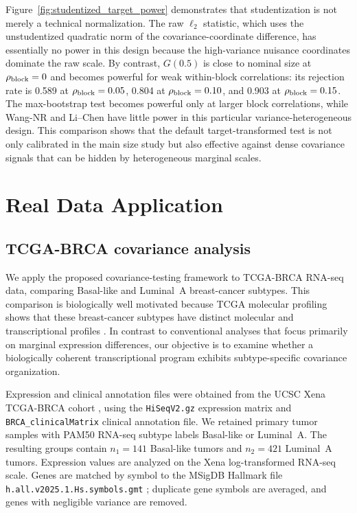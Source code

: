 \documentclass[
  12pt]{article}
\theoremstyle{plain}
\theoremstyle{definition}
\theoremstyle{remark}
\begin{document}
Figure~\ref{fig:studentized_target_power} demonstrates that studentization is
not merely a technical normalization.  The raw \(\ell_2\) statistic, which
uses the unstudentized quadratic norm of the covariance-coordinate difference,
has essentially no power in this design because the high-variance nuisance
coordinates dominate the raw scale.  By contrast, \(G(0.5)\) is close to
nominal size at \(\rho_{\rm block}=0\) and becomes powerful for weak
within-block correlations: its rejection rate is 0.589 at
\(\rho_{\rm block}=0.05\), 0.804 at \(\rho_{\rm block}=0.10\), and 0.903 at
\(\rho_{\rm block}=0.15\).  The max-bootstrap test becomes powerful only at
larger block correlations, while Wang-NR and Li--Chen have little power in this
particular variance-heterogeneous design.  This comparison shows that the
default target-transformed test is not only calibrated in the main size study
but also effective against dense covariance signals that can be hidden by
heterogeneous marginal scales.

\section{Real Data Application}\label{sec:realdata}

\subsection{TCGA-BRCA covariance analysis}

We apply the proposed covariance-testing framework to TCGA-BRCA RNA-seq data, comparing Basal-like and Luminal~A breast-cancer subtypes.  This comparison is biologically well motivated because TCGA molecular profiling shows that these breast-cancer subtypes have distinct molecular and transcriptional profiles \citep{tcga_brca_molecular_portraits_2012}.  In contrast to conventional analyses that focus primarily on marginal expression differences, our objective is to examine whether a biologically coherent transcriptional program exhibits subtype-specific covariance organization.

Expression and clinical annotation files were obtained from the UCSC Xena TCGA-BRCA cohort \citep{goldman_visualizing_2020}, using the \texttt{HiSeqV2.gz} expression matrix and \texttt{BRCA\_clinicalMatrix} clinical annotation file.  We retained primary tumor samples with PAM50 RNA-seq subtype labels Basal-like or Luminal~A.  The resulting groups contain \(n_1=141\) Basal-like tumors and \(n_2=421\) Luminal~A tumors.  Expression values are analyzed on the Xena log-transformed RNA-seq scale.  Genes are matched by symbol to the MSigDB Hallmark file \texttt{h.all.v2025.1.Hs.symbols.gmt} \citep{liberzon_molecular_2015}; duplicate gene symbols are averaged, and genes with negligible variance are removed.
\end{document}
